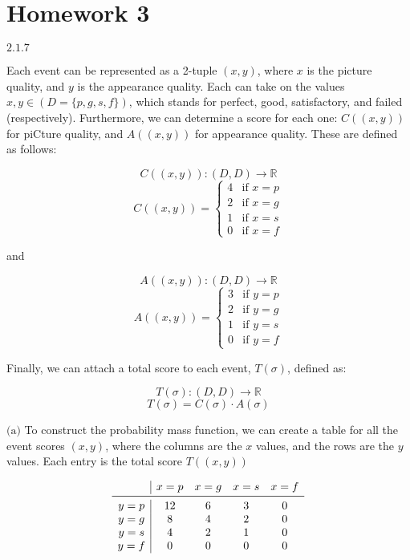 \documentclass{article}
\newcommand{\problem}[2]{$\boxed{\text{#1.#2}}$}
\newcommand{\subproblem}[3]{$\boxed{\text{(#3)}}$}
\begin{document}
\section*{Homework 3}

%
\problem{2.1}{7}

Each event can be represented as a 2-tuple $(x,y)$, where $x$ is the
picture quality, and $y$ is the appearance quality. Each can take on
the values $x,y\in(D=\{p,g,s,f\})$, which stands for perfect, good,
satisfactory, and failed (respectively). Furthermore, we can determine
a score for each one: $C((x,y))$ for piCture quality, and $A((x,y))$
for appearance quality. These are defined as follows:

\[
C((x,y)):(D,D)\rightarrow\mathbb{R}
\] \[
C((x,y))=\begin{cases}4 & \text{if $x=p$} \\
2 & \text{if $x=g$} \\
1 & \text{if $x=s$} \\
0 & \text{if $x=f$}
\end{cases}
\]

and

\[
A((x,y)):(D,D)\rightarrow\mathbb{R}
\] \[
A((x,y))=\begin{cases}3 & \text{if $y=p$} \\
2 & \text{if $y=g$} \\
1 & \text{if $y=s$} \\
0 & \text{if $y=f$}
\end{cases}
\]

Finally, we can attach a total score to each event, $T(\sigma)$,
defined as:

\[
T(\sigma):(D,D)\rightarrow\mathbb{R}
\] \[
T(\sigma)=C(\sigma)\cdot A(\sigma)
\]

%
\subproblem{2.1}{7}{a} To construct the probability mass function, we
can create a table for all the event scores $(x,y)$, where the columns
are the $x$ values, and the rows are the $y$ values. Each entry is the
total score $T((x,y))$

\[
\begin{array}{c|cccc}
  & x=p & x=g & x=s & x=f \\
\midrule
y=p & 12 & 6 & 3 & 0 \\
y=g & 8 & 4 & 2 & 0 \\
y=s & 4 & 2 & 1 & 0 \\
y=f & 0 & 0 & 0 & 0 \\
\end{array}
\]
\end{document}
